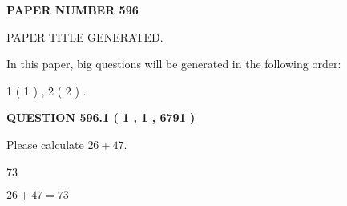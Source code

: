 \documentclass[12pt]{article}
\begin{document}
   
   
   
\newpage 
\setcounter{page}{ 
   596001 } 
   
   
   
   
 {\textbf{ \Large{ PAPER NUMBER  596  }}}
   
   
\vspace{0.2in}
   
   
   
   
   
   
   
   
 \vspace{0.2in}
 
 
 
 
   
   
 PAPER TITLE GENERATED.
   
   
   
\vspace{0.2in}
   
In this paper, big questions will be generated in the following order: 
   
   
   1 ( 1 )
 ,
   2 ( 2 )
 .
  
\vspace{0.2in}
  
{\textbf{\Large{QUESTION
596.1 
 ( 1 , 1 , 6791 )
}}}
  
  
 
Please calculate $ %
26 +  %
47 $.
 
 
 
\noindent{}
 
 

73
 
 
\noindent{}
 
 

 
 
 
\noindent{}
 
 

$ %
26 +  %
47=   %
73$
 
 
\noindent{}
 
 

 
   
   
   
\end{document}
